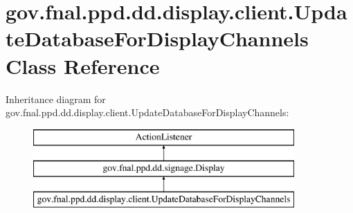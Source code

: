 \hypertarget{classgov_1_1fnal_1_1ppd_1_1dd_1_1display_1_1client_1_1UpdateDatabaseForDisplayChannels}{\section{gov.\-fnal.\-ppd.\-dd.\-display.\-client.\-Update\-Database\-For\-Display\-Channels Class Reference}
\label{classgov_1_1fnal_1_1ppd_1_1dd_1_1display_1_1client_1_1UpdateDatabaseForDisplayChannels}
}
Inheritance diagram for gov.\-fnal.\-ppd.\-dd.\-display.\-client.\-Update\-Database\-For\-Display\-Channels\-:\begin{figure}[H]
\begin{center}
\leavevmode
\includegraphics[height=3.000000cm]{classgov_1_1fnal_1_1ppd_1_1dd_1_1display_1_1client_1_1UpdateDatabaseForDisplayChannels}
\end{center}
\end{figure}
